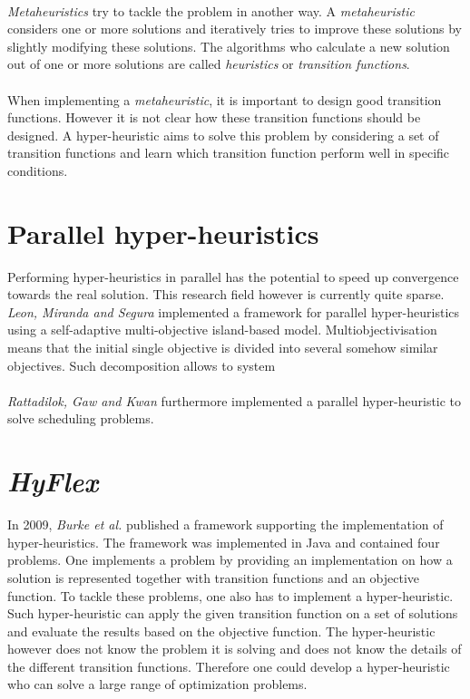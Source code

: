 \documentclass[a4paper,10pt]{article}
\newcommand{\seclab}[1]{\label{sec:#1}}
\begin{document}
\paragraph{}
\emph{Metaheuristics} try to tackle the problem in another way. A \emph{metaheuristic} considers one or more solutions and iteratively tries to improve these solutions by slightly modifying these solutions. The algorithms who calculate a new solution out of one or more solutions are called \emph{heuristics} or \emph{transition functions}.

\paragraph{}
When implementing a \emph{metaheuristic}, it is important to design good transition functions. However it is not clear how these transition functions should be designed. A hyper-heuristic aims to solve this problem by considering a set of transition functions and learn which transition function perform well in specific conditions.

\section{Parallel hyper-heuristics}


Performing hyper-heuristics in parallel has the potential to speed up convergence towards the real solution. This research field however is currently quite sparse. \emph{Leon, Miranda and Segura} implemented a framework for parallel hyper-heuristics using a self-adaptive multi-objective island-based model. Multiobjectivisation means that the initial single objective is divided into several somehow similar objectives. Such decomposition allows to system 

\paragraph{}
\emph{Rattadilok, Gaw and Kwan} furthermore implemented a parallel hyper-heuristic to solve scheduling problems. %

\section{\emph{HyFlex}}
\seclab{hyflex}
In 2009, \emph{Burke et al.}\cite{burke} published a framework supporting the implementation of hyper-heuristics. The framework was implemented in Java and contained four problems. One implements a problem by providing an implementation on how a solution is represented together with transition functions and an objective function. To tackle these problems, one also has to implement a hyper-heuristic. Such hyper-heuristic can apply the given transition function on a set of solutions and evaluate the results based on the objective function. The hyper-heuristic however does not know the problem it is solving and does not know the details of the different transition functions. Therefore one could develop a hyper-heuristic who can solve a large range of optimization problems.
\end{document}
